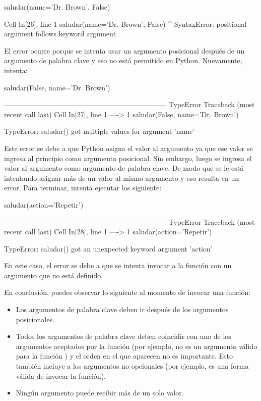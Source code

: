 \begin{pyin}
saludar(name='Dr. Brown', False)
\end{pyin}
\begin{pyerror}
  Cell In[26], line 1
    saludar(name='Dr. Brown', False)
                                   ^
SyntaxError: positional argument follows keyword argument
\end{pyerror}
El error ocurre porque se intenta usar un argumento posicional después de un argumento de palabra clave y eso no está permitido en Python. Nuevamente, intenta:

\begin{pyin}
saludar(False, name='Dr. Brown')
\end{pyin}
\begin{pyerror}
    ---------------------------------------------------------------------
    TypeError                           Traceback (most recent call last)
    Cell In[27], line 1
    ----> 1 saludar(False, name='Dr. Brown')
    
    TypeError: saludar() got multiple values for argument 'name'
\end{pyerror}

Este error se debe a que Python asigna el valor  al argumento  ya que ese valor se ingresa al principio como argumento posicional. Sin embargo, luego se ingresa el valor  al argumento  como argumento de palabra clave. De modo que se le está intentando asignar más de un valor al mismo argumento y eso resulta en un error. Para terminar, intenta ejecutar los siguiente:

\begin{pyin}
saludar(action='Repetir')
\end{pyin}
\begin{pyerror}
---------------------------------------------------------------------
TypeError                           Traceback (most recent call last)
Cell In[28], line 1
----> 1 saludar(action='Repetir')

TypeError: saludar() got an unexpected keyword argument 'action'
\end{pyerror}
En este caso, el error se debe a que se intenta invocar a la función con un argumento que no está definido.

En conclusión, puedes observar lo siguiente al momento de invocar una función: 
\begin{itemize}
    \item Los argumentos de palabra clave deben ir después de los argumentos posicionales.
    \item Todos los argumentos de palabra clave deben coincidir con uno de los argumentos aceptados por la función (por ejemplo,  no es un argumento válido para la función ) y el orden en el que aparecen no es importante. Esto también incluye a los argumentos no opcionales (por ejemplo,  es una forma válida de invocar la función).
    \item Ningún argumento puede recibir más de un solo valor. 
\end{itemize}

